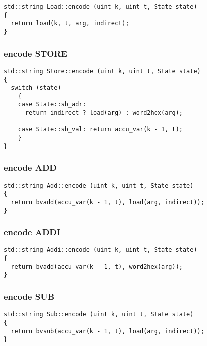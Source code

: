 \begin{lstlisting}[style=c++]
std::string Load::encode (uint k, uint t, State state)
{
  return load(k, t, arg, indirect);
}
\end{lstlisting}

\subsubsection{encode STORE}

\begin{lstlisting}[style=c++]
std::string Store::encode (uint k, uint t, State state)
{
  switch (state)
    {
    case State::sb_adr:
      return indirect ? load(arg) : word2hex(arg);

    case State::sb_val: return accu_var(k - 1, t);
    }
}
\end{lstlisting}

\subsubsection{encode ADD}

\begin{lstlisting}[style=c++]
std::string Add::encode (uint k, uint t, State state)
{
  return bvadd(accu_var(k - 1, t), load(arg, indirect));
}
\end{lstlisting}

\subsubsection{encode ADDI}

\begin{lstlisting}[style=c++]
std::string Addi::encode (uint k, uint t, State state)
{
  return bvadd(accu_var(k - 1, t), word2hex(arg));
}
\end{lstlisting}

\subsubsection{encode SUB}

\begin{lstlisting}[style=c++]
std::string Sub::encode (uint k, uint t, State state)
{
  return bvsub(accu_var(k - 1, t), load(arg, indirect));
}
\end{lstlisting}


